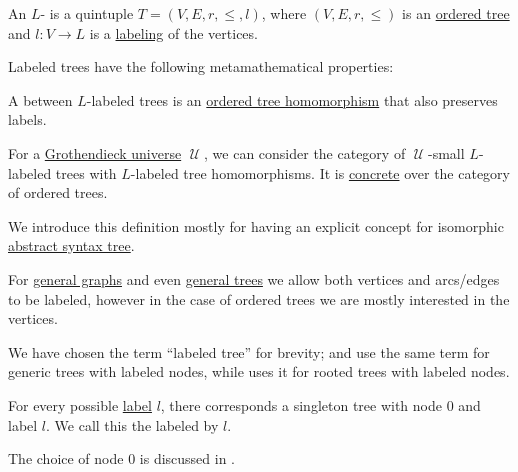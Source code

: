 \begin{definition}\label{def:labeled_tree}\mimprovised
  An \( L \)- is a quintuple \( T = (V, E, r, \leq, l) \), where \( (V, E, r, \leq) \) is an \hyperref[def:ordered_tree]{ordered tree} and \( l: V \to L \) is a \hyperref[def:labeled_set]{labeling} of the vertices.

  Labeled trees have the following metamathematical properties:
  \begin{thmenum}
     A  between \( L \)-labeled trees is an \hyperref[def:ordered_tree/homomorphism]{ordered tree homomorphism} that also preserves labels.

     For a \hyperref[def:grothendieck_universe]{Grothendieck universe} \( \mscrU \), we can consider the category of \( \mscrU \)-small \( L \)-labeled trees with \( L \)-labeled tree homomorphisms. It is \hyperref[def:concrete_category]{concrete} over the category of ordered trees.
  \end{thmenum}
\end{definition}
\begin{comments}
  \item We introduce this definition mostly for having an explicit concept for isomorphic \hyperref[con:abstract_syntax_tree]{abstract syntax tree}.

  \item For \hyperref[rem:arbitrary_kind_graph]{general graphs} and even \hyperref[def:tree]{general trees} we allow both vertices and arcs/edges to be labeled, however in the case of ordered trees we are mostly interested in the vertices.

  We have chosen the term \enquote{labeled tree} for brevity;  and  use the same term for generic trees with labeled nodes, while  uses it for rooted trees with labeled nodes.
\end{comments}

\begin{definition}\label{def:canonical_singleton_tree}\mimprovised
  For every possible \hyperref[def:labeled_set]{label} \( l \), there corresponds a singleton tree with node \( 0 \) and label \( l \). We call this the  labeled by \( l \).

  The choice of node \( 0 \) is discussed in .
\end{definition}
